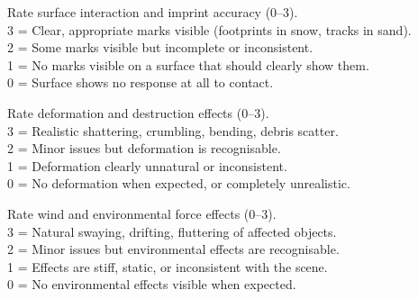 \documentclass{llmxive}
\begin{document}
\vspace{4pt}

\begin{tcolorbox}[d5box, title={Track 2 Rubric --- Surface Tracks \& Imprints}]
\ttfamily\scriptsize
Rate surface interaction and imprint accuracy (0--3).\\
3 = Clear, appropriate marks visible (footprints in snow, tracks in sand).\\
2 = Some marks visible but incomplete or inconsistent.\\
1 = No marks visible on a surface that should clearly show them.\\
0 = Surface shows no response at all to contact.
\end{tcolorbox}

\vspace{4pt}

\begin{tcolorbox}[d5box, title={Track 2 Rubric --- Deformation \& Destruction}]
\ttfamily\scriptsize
Rate deformation and destruction effects (0--3).\\
3 = Realistic shattering, crumbling, bending, debris scatter.\\
2 = Minor issues but deformation is recognisable.\\
1 = Deformation clearly unnatural or inconsistent.\\
0 = No deformation when expected, or completely unrealistic.
\end{tcolorbox}

\vspace{4pt}

\begin{tcolorbox}[d5box, title={Track 2 Rubric --- Wind \& Environmental Forces}]
\ttfamily\scriptsize
Rate wind and environmental force effects (0--3).\\
3 = Natural swaying, drifting, fluttering of affected objects.\\
2 = Minor issues but environmental effects are recognisable.\\
1 = Effects are stiff, static, or inconsistent with the scene.\\
0 = No environmental effects visible when expected.
\end{tcolorbox}

\vspace{4pt}
\end{document}

